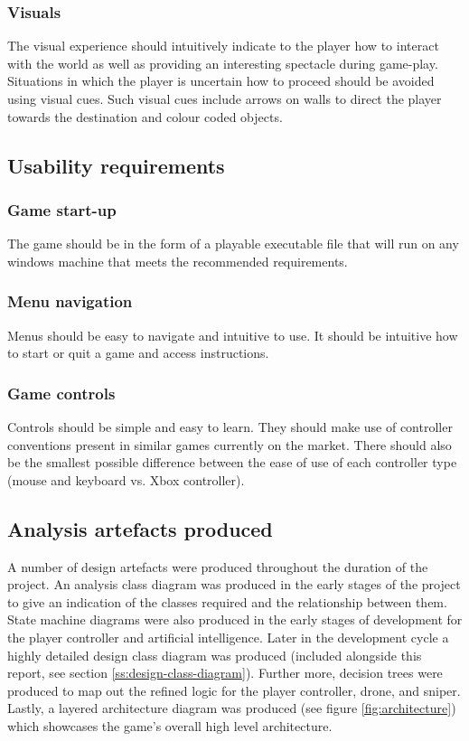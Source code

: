 \documentclass[11pt,a4paper]{article}
\begin{document}
\subsubsection{Visuals}
The visual experience should intuitively indicate to the player how to interact with the world as well as providing an interesting spectacle during game-play. Situations in which the player is uncertain how to proceed should be avoided using visual cues. Such visual cues include arrows on walls to direct the player towards the destination and colour coded objects.
\subsection{Usability requirements}
\subsubsection{Game start-up}
The game should be in the form of a playable executable file that will run on any windows machine that meets the recommended requirements.
\subsubsection{Menu navigation}
Menus should be easy to navigate and intuitive to use. It should be intuitive how to start or quit a game and access instructions.
\subsubsection{Game controls}
Controls should be simple and easy to learn. They should make use of controller conventions present in similar games currently on the market. There should also be the smallest possible difference between the ease of use of each controller type (mouse and keyboard vs. Xbox controller).
\subsection{Analysis artefacts produced}
A number of design artefacts were produced throughout the duration of the project. An analysis class diagram was produced in the early stages of the project to give an indication of the classes required and the relationship between them. State machine diagrams were also produced in the early stages of development for the player controller and artificial intelligence. Later in the development cycle a highly detailed design class diagram was produced (included alongside this report, see section \ref{ss:design-class-diagram}). Further more, decision trees were produced to map out the refined logic for the player controller, drone, and sniper. Lastly, a layered architecture diagram was produced (see figure \ref{fig:architecture}) which showcases the game's overall high level architecture.
\end{document}
